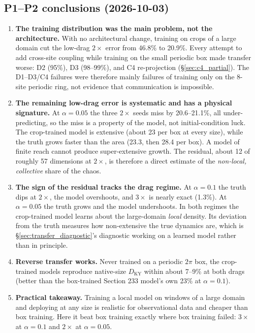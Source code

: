 \documentclass[11pt]{article}
\begin{document}
\subsection{P1--P2 conclusions (2026-10-03)}
\label{sec:p1p2_conclusions}

\begin{enumerate}[leftmargin=*]
\item \textbf{The training distribution was the main problem, not the
  architecture.} With no architectural change, training on crops of a
  large domain cut the low-drag $2\times$ error from 46.8\% to 20.9\%.
  Every attempt to add cross-site coupling while training on the small
  periodic box made transfer worse: D2 (95\%), D3 (98--99\%), and C4
  re-projection (\S\ref{sec:c4_partial}). The D1--D3/C4 failures were
  therefore mainly failures of training only on the 8-site periodic
  ring, not evidence that communication is impossible.
\item \textbf{The remaining low-drag error is systematic and has a
  physical signature.} At $\alpha{=}0.05$ the three $2\times$ seeds miss
  by 20.6--21.1\%, all under-predicting, so the miss is a property of the
  model, not initial-condition luck. The crop-trained model is extensive
  (about 23 per box at every size), while the truth grows faster than the
  area (23.3, then 28.4 per box). A model of finite reach cannot produce
  super-extensive growth. The residual, about 12 of roughly 57
  dimensions at $2\times$, is therefore a direct estimate of the
  \emph{non-local, collective} share of the chaos.
\item \textbf{The sign of the residual tracks the drag regime.} At
  $\alpha{=}0.1$ the truth dips at $2\times$, the model overshoots, and
  $3\times$ is nearly exact (1.3\%). At $\alpha{=}0.05$ the truth grows
  and the model undershoots. In both regimes the crop-trained model
  learns about the large-domain \emph{local} density. Its deviation from
  the truth measures how non-extensive the true dynamics are, which is
  \S\ref{sec:transfer_diagnostic}'s diagnostic working on a learned model
  rather than in principle.
\item \textbf{Reverse transfer works.} Never trained on a periodic
  $2\pi$ box, the crop-trained models reproduce native-size
  $D_{\mathrm{KY}}$ within about 7--9\% at both drags (better than the
  box-trained Section 233 model's own 23\% at $\alpha{=}0.1$).
\item \textbf{Practical takeaway.} Training a local model on windows of
  a large domain and deploying at any size is realistic for observational
  data and cheaper than box training. Here it beat box training exactly
  where box training failed: $3\times$ at $\alpha{=}0.1$ and $2\times$ at
  $\alpha{=}0.05$.
\end{enumerate}
\end{document}

